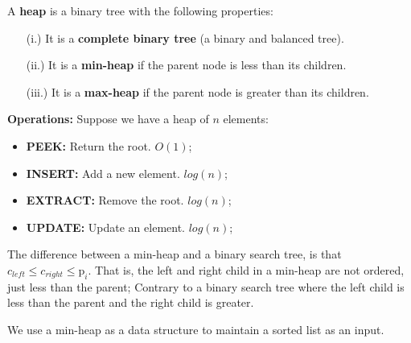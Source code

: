 \begin{Def}[Heap]

    A \textbf{heap} is a binary tree with the following properties:
    \begin{enumerate}
        \item[(i.)] It is a \textbf{complete binary tree} (a binary and balanced tree).
        \item[(ii.)] It is a \textbf{min-heap} if the parent node is less than its children.
        \item[(iii.)] It is a \textbf{max-heap} if the parent node is greater than its children.
    \end{enumerate}
    \noindent
    \textbf{Operations:} Suppose we have a heap of $n$ elements:
    \begin{itemize}
        \item \textbf{PEEK:} Return the root. $O(1)$;
        \item \textbf{INSERT:} Add a new element. $log(n)$;
        \item \textbf{EXTRACT:} Remove the root. $log(n)$;
        \item \textbf{UPDATE:} Update an element. $log(n)$;
    \end{itemize}
\end{Def}

\newpage

\begin{Tip}
    The difference between a min-heap and a binary search tree, is that $c_{left} \leq c_{right} \leq \text{p}_{i}$. That is, the left and right child in a min-heap are not ordered, just less than the parent;
    Contrary to a binary search tree where the left child is less than the parent and the right child is greater.
\end{Tip}

\noindent 
We use a min-heap as a data structure to maintain a sorted list as an input.

